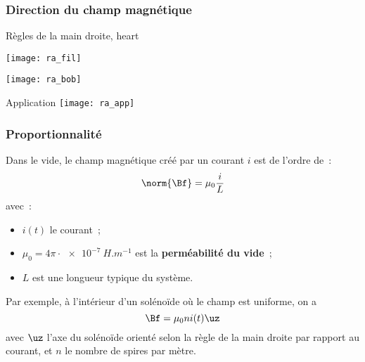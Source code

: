 \documentclass[../main/main.tex]{subfiles}
\begin{document}
\subsubsection{Direction du champ magnétique}
\label{sssec:chpdir}
\begin{tprop}{Règles de la main droite, heart}
    \begin{minipage}[t]{.45\linewidth}
      \begin{center}
        \texttt{[image: ra\_fil]}
        \label{fig:rafil}
      \end{center}
    \end{minipage}
    \hfill
    \begin{minipage}[t]{.45\linewidth}
      \begin{center}
        \texttt{[image: ra\_bob]}
        \label{fig:rabob}
      \end{center}
    \end{minipage}
\end{tprop}
\begin{rexem}{Application}
  \centering
  \texttt{[image: ra\_app]}
\end{rexem}

\subsubsection{Proportionnalité}
\label{sssec:prop}
Dans le vide, le champ magnétique créé par un courant $i$ est de l'ordre de~:
\[
  \norm{\Bf} = \mu_0 \frac{i}{L}
\]
avec~:
\begin{itemize}[label=$\diamond$, leftmargin=10pt]
  \item $i (t)$ le courant~;
  \item $\mu_0 = 4\pi\cdot \SI{e-7}{H.m ^{-1}}$ est la \textbf{perméabilité du
    vide}~;
  \item $L$ est une longueur typique du système.
\end{itemize}
Par exemple, à l'intérieur d'un solénoïde où le champ est uniforme, on a
\[
  \Bf = \mu_0ni (t)\uz
\]
avec $\uz$ l'axe du solénoïde orienté selon la règle de la main droite par
rapport au courant, et $n$ le nombre de spires par mètre.
\end{document}
